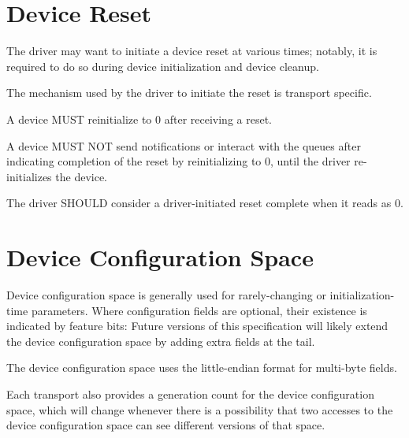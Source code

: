 \section{Device Reset}\label{sec:Basic Facilities of a Virtio Device / Device Reset}

The driver may want to initiate a device reset at various times; notably,
it is required to do so during device initialization and device cleanup.

The mechanism used by the driver to initiate the reset is transport specific.


A device MUST reinitialize  to 0 after receiving a reset.

A device MUST NOT send notifications or interact with the queues after
indicating completion of the reset by reinitializing 
to 0, until the driver re-initializes the device.


The driver SHOULD consider a driver-initiated reset complete when it
reads  as 0.

\section{Device Configuration Space}\label{sec:Basic Facilities of a Virtio Device / Device Configuration Space}

Device configuration space is generally used for rarely-changing or
initialization-time parameters.  Where configuration fields are
optional, their existence is indicated by feature bits: Future
versions of this specification will likely extend the device
configuration space by adding extra fields at the tail.

\begin{note}
The device configuration space uses the little-endian format
for multi-byte fields.
\end{note}

Each transport also provides a generation count for the device configuration
space, which will change whenever there is a possibility that two
accesses to the device configuration space can see different versions of that
space.

